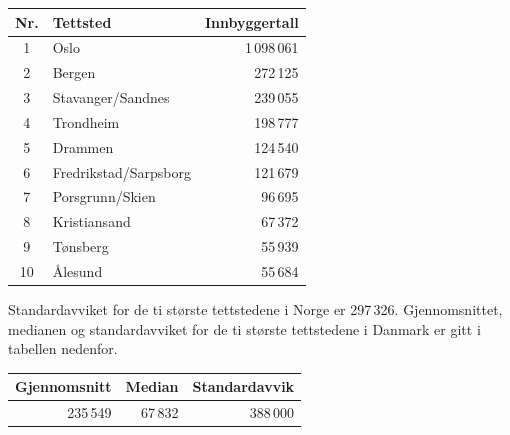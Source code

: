 \begin{table}[h]
	\centering
	\begin{tabular}{cl r}
		\hline
		Nr. & Tettsted & Innbyggertall \\
		\hline
		1  & Oslo                    & 1\,098\,061 \\ \hline
		2  & Bergen                  & 272\,125 \\ \hline
		3  & Stavanger/Sandnes       & 239\,055 \\ \hline
		4  & Trondheim               & 198\,777 \\ \hline
		5  & Drammen                 & 124\,540 \\ \hline
		6  & Fredrikstad/Sarpsborg   & 121\,679 \\ \hline
		7  & Porsgrunn/Skien         & 96\,695 \\ \hline
		8  & Kristiansand            & 67\,372 \\ \hline
		9  & Tønsberg                & 55\,939 \\ \hline
		10 & Ålesund                 & 55\,684 \\
		\hline
	\end{tabular}
\end{table}


Standardavviket for de ti største tettstedene i Norge er 297\,326.
Gjennomsnittet, medianen og standardavviket for de ti største tettstedene i Danmark er gitt i tabellen nedenfor.

\begin{table}[h]
	\centering
	\begin{tabular}{|r |r |r|}
		\hline
		Gjennomsnitt & Median & Standardavvik \\ 
		\hline
		235\,549 & 67\,832 & 388\,000 \\ \hline
	\end{tabular}
\end{table}

\newpage

